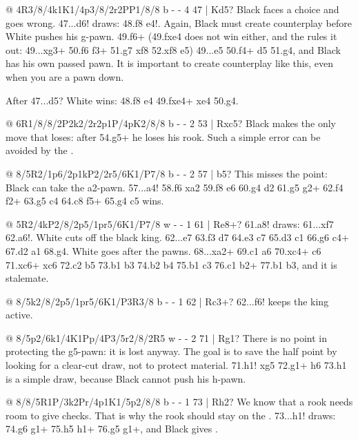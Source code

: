 @ 4R3/8/4k1K1/4p3/8/2r2PP1/8/8 b - - 4 47 | Kd5?
Black faces a choice and goes wrong. 47...\K d6! draws: 48.\R f8 e4!. Again, Black must create
counterplay before White pushes his g-pawn. 49.\R f6+ (49.fxe4 does not win either, and the
 rules it out: 49...\R xg3+ 50.\K f6 \R f3+ 51.\K g7 \R xf8 52.\K xf8
\K e5) 49...\K e5 50.f4+ \K d5 51.g4, and Black has
his own passed pawn. It is important to create counterplay like this, even when you are a pawn
down.

After 47...\K d5? White wins: 48.\R f8 e4 49.fxe4+ \K xe4 50.g4.

@ 6R1/8/8/2P2k2/2r2p1P/4pK2/8/8 b - - 2 53 | Rxc5?
Black makes the only move that loses: after 54.\R g5+ he loses his rook. Such a simple error can
be avoided by the .

@ 8/5R2/1p6/2p1kP2/2r5/6K1/P7/8 b - - 2 57 | b5?
This misses the point: Black can take the a2-pawn. 57...\R a4! 58.f6 \R xa2 59.\R f8 \K e6
60.\K g4 \R d2 61.\K g5 \R g2+ 62.\K f4 \R f2+ 63.\K g5 c4 64.\R c8 \R f5+ 65.\K g4 \R c5 wins.

@ 5R2/4kP2/8/2p5/1pr5/6K1/P7/8 w - - 1 61 | Re8+?
61.\R a8! draws: 61...\K xf7 62.\R a6!. White cuts off the black king.
62...\K e7 63.\K f3 \K d7 64.\K e3 \K c7 65.\K d3 \R c1 66.\R g6 c4+ 67.\K d2 \R a1 68.\R g4.
White goes after the pawns. 68...\R xa2+ 69.\K c1 \R a6 70.\R xc4+ \R c6 71.\R xc6+ \K xc6
72.\K c2 \K b5 73.\K b1 b3 74.\K b2 \K b4 75.\K b1 \K c3 76.\K c1 b2+ 77.\K b1 \K b3, and it is
stalemate.

@ 8/5k2/8/2p5/1pr5/6K1/P3R3/8 b - - 1 62 | Rc3+?
62...\K f6! keeps the king active.

@ 8/5p2/6k1/4K1Pp/4P3/5r2/8/2R5 w - - 2 71 | Rg1?
There is no point in protecting the g5-pawn: it is lost anyway. The goal is to save the half point
by looking for a clear-cut draw, not to protect material.
71.\R h1! \K xg5 72.\R g1+ \K h6 73.\R h1 is a simple draw, because Black cannot push his h-pawn.

@ 8/8/5R1P/3k2Pr/4p1K1/5p2/8/8 b - - 1 73 | Rh2?
We know that a rook needs room to give checks. That is why the rook should stay on the
. 73...\R h1! draws: 74.g6 \R g1+ 75.\K h5 \R h1+
76.\K g5 \R g1+, and Black gives .

